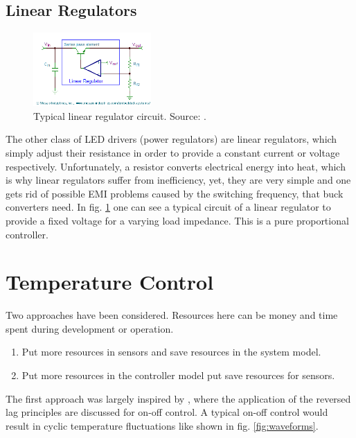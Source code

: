\subsection{Linear Regulators}
\label{subsec:buck_conv}

\begin{figure}[H]                                                         
\centering          
\includegraphics[width=0.4\textwidth]{./fig/linreg1}   
\caption[Typical linear regulator circuit.]{Typical linear regulator circuit. Source: \cite{online:linreg1}.}   
\label{fig:linreg1}
\end{figure}  

The other class of \gls{LED} drivers (power regulators) are linear regulators, which simply adjust their resistance in order to provide a constant current or voltage respectively. Unfortunately, a resistor converts electrical energy into heat, which is why linear regulators suffer from inefficiency, yet, they are very simple and one gets rid of possible \gls{EMI} problems caused by the switching frequency, that buck converters need. In fig. \ref{fig:linreg1} one can see a typical circuit of a linear regulator to provide a fixed voltage for a varying load impedance. This is a pure proportional controller.  

\section{Temperature Control}
\label{sec:temperatureControl}
Two approaches have been considered. Resources here can be money and time spent during development or operation.
\begin{enumerate}
\item Put more resources in sensors and save resources in the system model.
\item Put more resources in the controller model put save resources for sensors.
\end{enumerate}
The first approach was largely inspired by \cite{article:revLag}, where the application of the reversed lag principles are discussed for on-off control. A typical on-off control would result in cyclic temperature fluctuations like shown in fig. \ref{fig:waveforms}.

